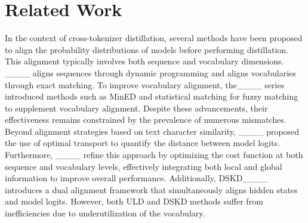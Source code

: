 \section{Related Work}
In the context of cross-tokenizer distillation, several methods have been proposed to align the probability distributions of models before performing distillation. This alignment typically involves both sequence and vocabulary dimensions.
____ aligns sequences through dynamic programming and aligns vocabularies through exact matching. To improve vocabulary alignment, the____ series introduced methods such as MinED and statistical matching for fuzzy matching to supplement vocabulary alignment.
Despite these advancements, their effectiveness remains constrained by the prevalence of numerous mismatches. Beyond alignment strategies based on text character similarity, ____ proposed the use of optimal transport to quantify the distance between model logits. Furthermore, ____ refine this approach by optimizing the cost function at both sequence and vocabulary levels, effectively integrating both local and global information to improve overall performance. Additionally, DSKD____ introduces a dual alignment framework that simultaneously aligns hidden states and model logits. However, both ULD and DSKD methods suffer from inefficiencies due to underutilization of the vocabulary.